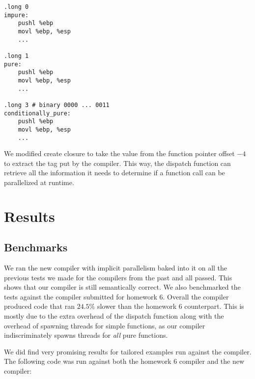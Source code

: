 \documentclass{acm_proc_article-sp}
\begin{document}
\begin{verbatim}
.long 0
impure:
    pushl %ebp
    movl %ebp, %esp
    ...

.long 1
pure:
    pushl %ebp
    movl %ebp, %esp
    ...

.long 3 # binary 0000 ... 0011
conditionally_pure:
    pushl %ebp
    movl %ebp, %esp
    ...
\end{verbatim}

We modified create closure to take the value from the function pointer offset $-4$ to extract the tag
put by the compiler. This way, the dispatch function can retrieve all the information it needs to
determine if a function call can be parallelized at runtime.


\section*{Results}

\subsection*{Benchmarks}
We ran the new compiler with implicit parallelism baked into it on all the previous tests we made for
the compilers from the past and all passed. This shows that our compiler is still semantically correct.
We also benchmarked the tests against the compiler submitted for homework 6. Overall the compiler produced
code that ran $24.5\%$ slower than the homework 6 counterpart. This is mostly due to the extra overhead
of the dispatch function along with the overhead of spawning threads for simple functions, as our compiler
indiscriminately spawns threads for \emph{all} pure functions.

We did find very promising results for tailored examples run against the compiler. The following code was
run against both the homework 6 compiler and the new compiler:
\end{document}
